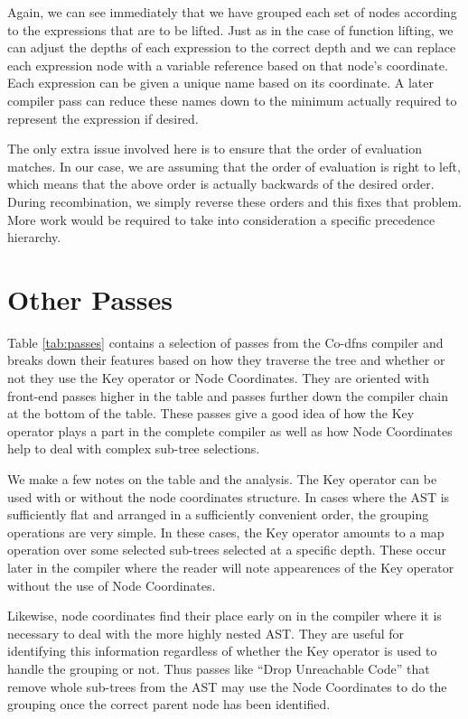 \documentclass[numbers,preprint]{sigplanconf}
\begin{document}
Again, we can see immediately that we have grouped each set of nodes
according to the expressions that are to be lifted. Just as in the
case of function lifting, we can adjust the depths of each expression
to the correct depth and we can replace each expression node with a
variable reference based on that node’s coordinate. Each expression
can be given a unique name based on its coordinate. A later compiler
pass can reduce these names down to the minimum actually required to
represent the expression if desired.

The only extra issue involved here is to ensure that the order of
evaluation matches. In our case, we are assuming that the order of
evaluation is right to left, which means that the above order is
actually backwards of the desired order. During recombination, we
simply reverse these orders and this fixes that problem. More work
would be required to take into consideration a specific precedence
hierarchy.

\section{Other Passes}

Table \ref{tab:passes} contains a selection of passes from the
Co-dfns compiler and breaks down their features based on how they
traverse the tree and whether or not they use the Key operator or
Node Coordinates. They are oriented with front-end passes higher in
the table and passes further down the compiler chain at the bottom
of the table. These passes give a good idea of how the Key operator
plays a part in the complete compiler as well as how Node Coordinates
help to deal with complex sub-tree selections.

We make a few notes on the table and the analysis. The Key operator
can be used with or without the node coordinates structure. In cases
where the AST is sufficiently flat and arranged in a sufficiently
convenient order, the grouping operations are very simple. In these
cases, the Key operator amounts to a map operation over some selected
sub-trees selected at a specific depth. These occur later in the
compiler where the reader will note appearences of the Key operator
without the use of Node Coordinates.

Likewise, node coordinates find their place early on in the compiler
where it is necessary to deal with the more highly nested AST. They
are useful for identifying this information regardless of whether the
Key operator is used to handle the grouping or not. Thus passes like
``Drop Unreachable Code'' that remove whole sub-trees from the AST
may use the Node Coordinates to do the grouping once the correct
parent node has been identified.
\end{document}

